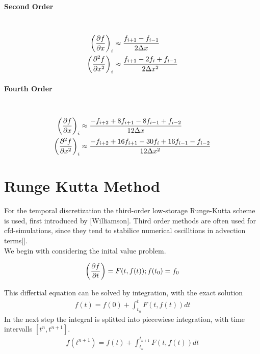 \paragraph{Second Order}\mbox{}\\
\begin{align}
    \left(\pdn[f]{x}\right)_i &\approx \frac{f_{i+1} - f_{i-1}}{2\Delta x} \\
    \left(\pdn[^2f]{x^2}\right)_i &\approx \frac{f_{i+1} - 2 f_i +  f_{i-1}}{2\Delta x^2}
\end{align}
\paragraph{Fourth Order}\mbox{}\\
\begin{align}
    \left(\pdn[f]{x}\right)_i &\approx \frac{-f_{i+2} + 8f_{i+1} - 8f_{i-1} + f_{i-2}}{12\Delta x} \\
    \left(\pdn[^2f]{x^2}\right)_i &\approx \frac{-f_{i+2} + 16f_{i+1} -30f_i + 16f_{i-1} - f_{i-2}}{12\Delta x^2} \\
\end{align}

\newpage

\section{Runge Kutta Method}

For the temporal discretization the third-order low-storage Runge-Kutta scheme is used, first introduced by [Williamson].
Third order methods are often used for cfd-simulations, since they tend to stabilice numerical oscilltions in advection terms[].\\
We begin with considering the inital value problem.

\begin{align}
    \left(\pdn[f]{t}\right) = F(t, f(t)) ; f(t_0) = f_0
\end{align}

This differtial equation can be solved by integration, with the exact solution
\begin{align}
    f(t) = f(0) + \int_{t_n}^{t}F(t, f(t))dt
\end{align}
In the next step the integral is splitted into piecewiese integration, with time intervalls $[t^n, t^{n+1}]$.
\begin{align}
    f(t^{n+1}) = f(t) + \int_{t_n}^{t_{n+1}}F(t, f(t))dt
\end{align}

